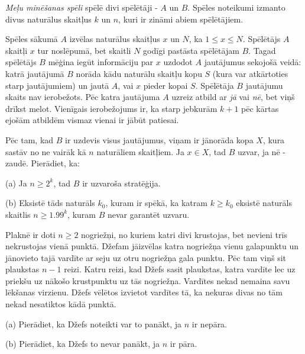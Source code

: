 \begin{problem}
\textit{Meļu minēšanas spēli} spēlē divi spēlētāji - $A$ un $B$. Spēles noteikumi izmanto divus naturālus skaitļus $k$ un $n$, kuri ir zināmi abiem spēlētājiem.

Spēles sākumā $A$ izvēlas naturālus skaitļus $x$ un $N$, ka  $1 \le x \le N$. Spēlētājs $A$ skaitļi $x$ tur noslēpumā, bet skaitli $N$ godīgi pastāsta spēlētājam $B$. 
Tagad spēlētājs $B$ mēģina iegūt informāciju par $x$ uzdodot $A$ jautājumus sekojošā veidā: katrā jautājumā $B$ norāda kādu naturālu skaitļu kopu $S$ (kura var atkārtoties starp jautājumiem) un jautā $A$, vai $x$ pieder kopai $S$. Spēlētāja $B$ jautājumu skaits nav ierobežots. Pēc katra jautājuma $A$ uzreiz atbild ar \textit{jā} vai \textit{nē}, bet viņš drīkst melot. Vienīgais ierobežojums ir, ka starp jebkurām $k+1$ pēc kārtas ejošām atbildēm vismaz vienai ir jābūt patiesai.

Pēc tam, kad $B$ ir uzdevis visus jautājumus, viņam ir jānorāda kopa $X$, kura sastāv no ne vairāk kā $n$ naturāliem skaitļiem. Ja $x \in X$, tad $B$ uzvar, ja nē - zaudē. Pierādiet, ka:

(a) Ja  $n \ge 2^k$, tad $B$ ir uzvaroša stratēģija.

(b) Eksistē tāds naturāls $k_0$, kuram ir spēkā, ka katram $k \ge k_0$ eksistē naturāls skaitlis  $n \ge 1.99^k$, kuram $B$ nevar garantēt uzvaru.

\end{problem}

\begin{problem}
Plaknē ir doti $n\ge 2$ nogriežņi, no kuriem katri divi krustojas, bet nevieni trīs nekrustojas vienā punktā. Džefam jāizvēlas katra nogriežņa vienu galapunktu un jānovieto tajā vardīte ar seju uz otru nogriežņa gala punktu. Pēc tam viņš sit plaukstas $n-1$ reizi. Katru reizi, kad Džefs sasit plaukstas, katra vardīte lec uz priekšu uz nākošo krustpunktu uz tās nogriežņa. Vardītes nekad nemaina savu lēkšanas virzienu. Džefs vēlētos izvietot vardītes tā, ka nekuras divas no tām nekad nesatiktos kādā punktā. 

(a) Pierādiet, ka Džefs noteikti var to panākt, ja $n$ ir nepāra.

(b) Pierādiet, ka Džefs to nevar panākt, ja $n$ ir pāra.
\end{problem}


%


